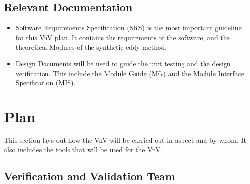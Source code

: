 \documentclass[12pt, titlepage]{article}
\begin{document}

\subsection{Relevant Documentation}

\begin{itemize}
  \item Software Requirements Specification (\href{https://github.com/omltcat/turbulent-flow/blob/main/docs/SRS/SRS.pdf}{SRS}) is the most important guideline for this VnV plan. It contains the requirements of the software, and the theoretical Modules of the synthetic eddy method. 
  \item Design Documents will be used to guide the unit testing and the design verification. This include the Module Guide (\href{https://github.com/omltcat/turbulent-flow/blob/main/docs/Design/SoftArchitecture/MG.pdf}{MG}) and the Module Interface Specification (\href{https://github.com/omltcat/turbulent-flow/blob/main/docs/Design/SoftDetailedDes/MIS.pdf}{MIS}). 
\end{itemize}



\section{Plan}

This section lays out how the VnV will be carried out in aspect and by whom. It also includes the tools that will be used for the VnV.


\subsection{Verification and Validation Team}
\end{document}

